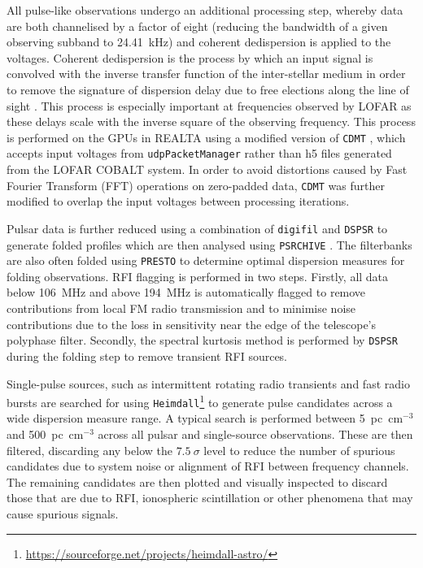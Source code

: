 All pulse-like observations undergo an additional processing step, whereby data are both channelised by a factor of eight (reducing the bandwidth of a given observing subband to 24.41~kHz) and coherent dedispersion is applied to the voltages.
Coherent dedispersion is the process by which an input signal is convolved with the inverse transfer function of the inter-stellar medium in order to remove the signature of dispersion delay due to free elections along the line of sight \citep{Hankins1987}. This process is especially important at frequencies observed by LOFAR as these delays scale with the inverse square of the observing frequency. This process is performed on the GPUs in REALTA using a modified version of \texttt{CDMT} \citep{Bassa2017}, which accepts input voltages from \texttt{udpPacketManager} rather than h5 files generated from the LOFAR COBALT system. In order to avoid distortions caused by Fast Fourier Transform (FFT) operations on zero-padded data, \texttt{CDMT} was further modified to overlap the input voltages between processing iterations.%

Pulsar data is further reduced using a combination of \texttt{digifil} and \texttt{DSPSR} \citep{vanStraten2011} to generate folded profiles which are then analysed using \texttt{PSRCHIVE} \citep{Hotan2004}. The filterbanks are also often folded using \texttt{PRESTO} \citep{Ransom2001} to determine optimal dispersion measures for folding observations. RFI flagging is performed in two steps. Firstly, all data below 106~MHz and above 194~MHz is automatically flagged to remove contributions from local FM radio transmission and to minimise noise contributions due to the loss in sensitivity near the edge of the telescope's polyphase filter. Secondly, the spectral kurtosis method is performed by \texttt{DSPSR} during the folding step to remove transient RFI sources.

Single-pulse sources, such as intermittent rotating radio transients \citep[RRATs;][]{McLaughlin2006} and fast radio bursts \citep[FRBs;][]{Lorimer2007,Thornton2013} are searched for using \texttt{Heimdall}\footnote{\hyperref[Heimdall]{https://sourceforge.net/projects/heimdall-astro/}} to generate pulse candidates across a wide dispersion measure range. A typical search is performed between 5~pc~cm$^{-3}$ and 500~pc~cm$^{-3}$ across all pulsar and single-source observations. These are then filtered, discarding any below the $7.5~\sigma$ level to reduce the number of spurious candidates due to system noise or alignment of RFI between frequency channels. The remaining candidates are then plotted and visually inspected to discard those that are due to RFI, ionospheric scintillation or other phenomena that may cause spurious signals. 

